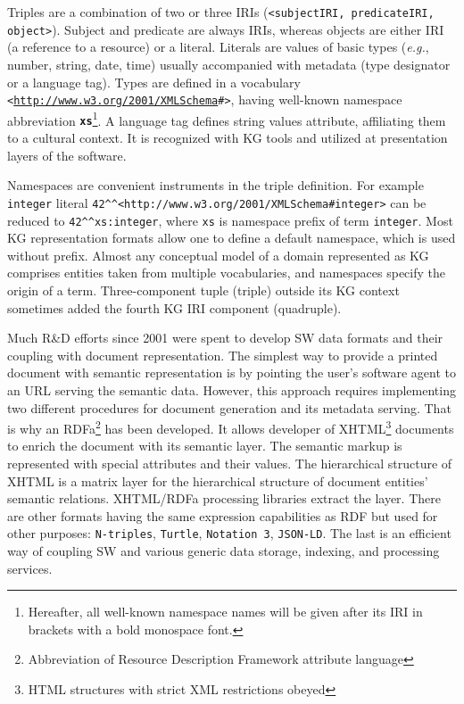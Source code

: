 \documentclass[
]{ceurart}
\newcommand{\ns}[1]{\textbf{\texttt{#1}}}
\begin{document}
Triples are a combination of two or three IRIs (\texttt{<subjectIRI, predicateIRI, object>}).  Subject and predicate are always IRIs, whereas objects are either IRI (a reference to a resource) or a literal. Literals are values of basic types (\emph{e.g.}, number, string, date, time) usually accompanied with metadata (type designator or a language tag). Types are defined in a vocabulary \texttt{<\url{http://www.w3.org/2001/XMLSchema}\#>}, having well-known namespace abbreviation \ns{xs}\footnote{Hereafter, all well-known namespace names will be given after its IRI in brackets with a bold monospace font.}. A language tag defines string values attribute, affiliating them to a cultural context. It is recognized with KG tools and utilized at presentation layers of the software.

Namespaces are convenient instruments in the triple definition. For example \verb|integer| literal \verb|42^^<http://www.w3.org/2001/XMLSchema#integer>| can be reduced to \verb|42^^xs:integer|, where \verb|xs| is namespace prefix of term \verb|integer|.  Most KG representation formats allow one to define a default namespace, which is used without prefix. Almost any conceptual model of a domain represented as KG comprises entities taken from multiple vocabularies, and namespaces specify the origin of a term. Three-component tuple (triple) outside its KG context sometimes added the fourth KG IRI component (quadruple).

Much R\&D efforts since 2001 \cite{tbl} were spent to develop SW data formats and their coupling with document representation. The simplest way to provide a printed document with semantic representation is by pointing the user's software agent to an URL serving the semantic data. However, this approach requires implementing two different procedures for document generation and its metadata serving. That is why an RDFa\footnote{Abbreviation of Resource Description Framework attribute language} has been developed. It allows developer of XHTML\footnote{HTML structures with strict XML restrictions obeyed} documents to enrich the document with its semantic layer.  The semantic markup is represented with special attributes and their values. The hierarchical structure of XHTML is a matrix layer for the hierarchical structure of document entities' semantic relations. XHTML/RDFa processing libraries extract the layer. There are other formats having the same expression capabilities as RDF but used for other purposes: \texttt{N-triples}, \texttt{Turtle}, \texttt{Notation~3}, \texttt{JSON-LD}.  The last is an efficient way of coupling SW and various generic data storage, indexing, and processing services.
\end{document}

